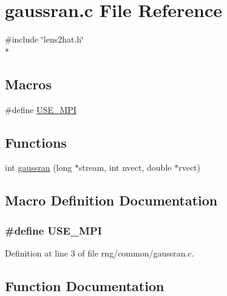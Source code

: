 \section{gaussran.\-c File Reference}
\label{rng_2common_2gaussran_8c}
{\ttfamily \#include \char`\"{}lens2hat.\-h\char`\"{}}\\*
\subsection*{Macros}
\begin{DoxyCompactItemize}
\item 
\#define \hyperlink{rng_2common_2gaussran_8c_a3869d282031f6ea6b50fdb980b758420}{U\-S\-E\-\_\-\-M\-P\-I}
\end{DoxyCompactItemize}
\subsection*{Functions}
\begin{DoxyCompactItemize}
\item 
int \hyperlink{rng_2common_2gaussran_8c_a39a2ff3b20f7a76c857538b7a20fe7bf}{gaussran} (long $\ast$stream, int nvect, double $\ast$rvect)
\end{DoxyCompactItemize}


\subsection{Macro Definition Documentation}
\subsubsection[{U\-S\-E\-\_\-\-M\-P\-I}]{\setlength{\rightskip}{0pt plus 5cm}\#define U\-S\-E\-\_\-\-M\-P\-I}\label{rng_2common_2gaussran_8c_a3869d282031f6ea6b50fdb980b758420}


Definition at line 3 of file rng/common/gaussran.\-c.



\subsection{Function Documentation}
